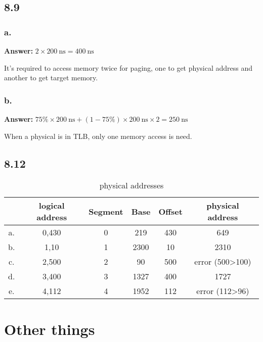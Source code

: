 \documentclass[11pt]{article}
\begin{document}
\subsection*{8.9}

\subsubsection*{a. }

\textbf{Answer:} $2\times 200~\text{ns} = 400~\text{ns}$

It's required to access memory twice for paging, one to get physical address and another to get target memory.

\subsubsection*{b. }

\textbf{Answer:} $ 75\% \times 200~\text{ns}+ (1-75\%)\times 200~\text{ns}\times 2 = 250~\text{ns}$

When a physical is in TLB, only one memory access is need.

\subsection*{8.12}

\begin{table}[H]
    \centering
    \begin{tabular}{|c|c|c|c|c|c|}
        \hline
        & logical address & Segment & Base & Offset & physical address             \\ \hline
        a. & 0,430           & 0       & 219  & 430    & 649                          \\ \hline
        b. & 1,10            & 1       & 2300 & 10     & 2310                         \\ \hline
        c. & 2,500           & 2       & 90   & 500    & error (500\textgreater{}100) \\ \hline
        d. & 3,400           & 3       & 1327 & 400    & 1727                         \\ \hline
        e. & 4,112           & 4       & 1952 & 112     & error (112\textgreater{}96)  \\ \hline
        \end{tabular}
        \caption{physical addresses}
\end{table}

\section*{Other things}
\end{document}
